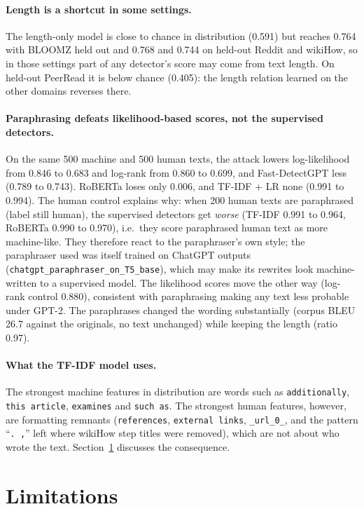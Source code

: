 \documentclass{nle}
\begin{document}
\paragraph{Length is a shortcut in some settings.} The length-only model is close to chance in distribution (0.591)
but reaches 0.764 with BLOOMZ held out and 0.768 and 0.744 on held-out Reddit and wikiHow, so in those settings
part of any detector's score may come from text length. On held-out PeerRead it is below chance (0.405): the
length relation learned on the other domains reverses there.

\paragraph{Paraphrasing defeats likelihood-based scores, not the supervised detectors.} On the same 500 machine
and 500 human texts, the attack lowers log-likelihood from 0.846 to 0.683 and log-rank from 0.860 to 0.699, and
Fast-DetectGPT less (0.789 to 0.743). RoBERTa loses only 0.006, and TF-IDF + LR none (0.991 to 0.994). The human
control explains why: when 200 human texts are paraphrased (label still human), the supervised detectors get
\emph{worse} (TF-IDF 0.991 to 0.964, RoBERTa 0.990 to 0.970), i.e.\ they score paraphrased human text as more
machine-like. They therefore react to the paraphraser's own style; the paraphraser used was itself trained on
ChatGPT outputs (\texttt{chatgpt\_paraphraser\_on\_T5\_base}), which may make its rewrites look machine-written to a
supervised model. The likelihood scores move the other way (log-rank control 0.880), consistent with paraphrasing
making any text less probable under GPT-2. The paraphrases changed the wording substantially (corpus BLEU 26.7
against the originals, no text unchanged) while keeping the length (ratio 0.97).

\paragraph{What the TF-IDF model uses.} The strongest machine features in distribution are words such as
\texttt{additionally}, \texttt{this article}, \texttt{examines} and \texttt{such as}. The strongest human features,
however, are formatting remnants (\texttt{references}, \texttt{external links}, \texttt{\_url\_0\_}, and the
pattern ``\texttt{. ,}'' left where wikiHow step titles were removed), which are not about who wrote the text. Section~\ref{sec:limits} discusses the
consequence.

\section{Limitations}\label{sec:limits}
\end{document}
